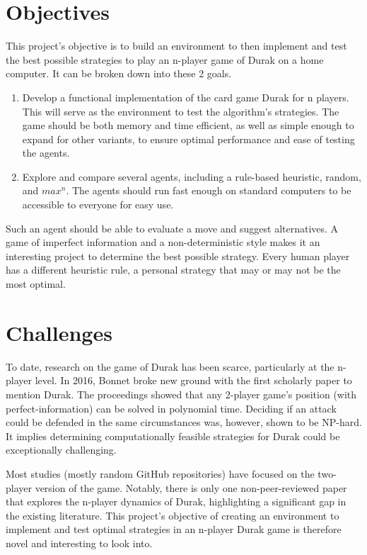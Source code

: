 \documentclass[a4paper, twoside, 12pt]{report}
\begin{document}
\section{Objectives}
This project's objective is to build an environment to then implement and test the best possible strategies to play an n-player game of Durak on a home computer. It can be broken down into these 2 goals.

\begin{enumerate}
	\item Develop a functional implementation of the card game Durak for n players. This will serve as the environment to test the algorithm's strategies. The game should be both memory and time efficient, as well as simple enough to expand for other variants, to ensure optimal performance and ease of testing the agents.
	\item Explore and compare several agents, including a rule-based heuristic, random, and \(max^n\). The agents should run fast enough on standard computers to be accessible to everyone for easy use.
\end{enumerate}

Such an agent should be able to evaluate a move and suggest alternatives. A game of imperfect information and a non-deterministic style makes it an interesting project to determine the best possible strategy. Every human player has a different heuristic rule, a personal strategy that may or may not be the most optimal.

\section{Challenges}
To date, research on the game of Durak has been scarce, particularly at the n-player level. In 2016, Bonnet broke new ground with the first scholarly paper\cite{bonnet} to mention Durak. The proceedings showed that any 2-player game's position (with perfect-information) can be solved in polynomial time. Deciding if an attack could be defended in the same circumstances was, however, shown to be NP-hard. It implies determining computationally feasible strategies for Durak could be exceptionally challenging.

Most studies (mostly random GitHub repositories) have focused on the two-player version of the game. Notably, there is only one non-peer-reviewed paper that explores the n-player dynamics of Durak\cite{durakMonteCarlo}, highlighting a significant gap in the existing literature. This project's objective of creating an environment to implement and test optimal strategies in an n-player Durak game is therefore novel and interesting to look into.
\end{document}

